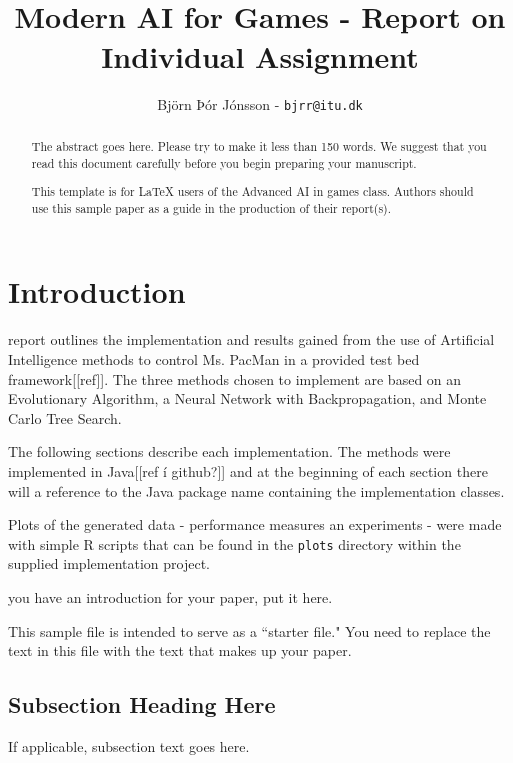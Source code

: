 \documentclass[conference]{IEEEtran}
\begin{document}
\title{\ \\ \LARGE\bf Modern AI for Games - Report on Individual Assignment}

\author{Björn Þór Jónsson - \texttt{bjrr@itu.dk}}


\maketitle

\begin{abstract}
The abstract goes here.  Please try to make it less than 150 words.
We suggest that you read this document carefully before you begin
preparing your manuscript.

This template is for LaTeX users of the Advanced AI in games class.
Authors should use this sample paper as a guide in the production of
their report(s).
\end{abstract}

\section{Introduction}
 report outlines the implementation and results gained from the use of Artificial Intelligence methods to control Ms. PacMan in a provided test bed framework[[ref]].  The three methods chosen to implement are based on an Evolutionary Algorithm, a Neural Network with Backpropagation, and Monte Carlo Tree Search.

The following sections describe each implementation.  The methods were implemented in Java[[ref í github?]] and at the beginning of each section there will a reference to the Java package name containing the implementation classes.

Plots of the generated data - performance measures an experiments - were made with simple R scripts that can be found in the \texttt{plots} directory within the supplied implementation project.

 you have an introduction for your paper, put it
here.

This sample file is intended to serve as a ``starter file."  You
need to replace the text in this file with the text that makes up
your paper.

\subsection{Subsection Heading Here}
If applicable, subsection text goes here.
\end{document}
